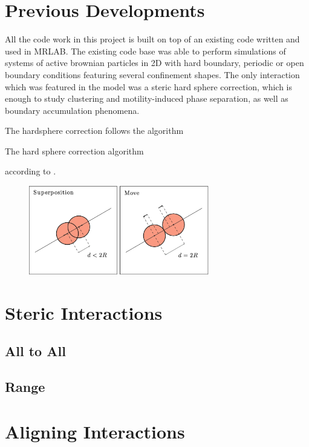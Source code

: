 \documentclass[../master_thesis_np.tex]{subfiles}
\begin{document}
	\section{Previous Developments}
	All the code work in this project is built on top of an existing code written and used in {\color{blue} MRLAB}. The existing code base was able to perform simulations of systems of active brownian particles in 2D with hard boundary, periodic or open boundary conditions featuring several confinement shapes. The only interaction which was featured in the model was a steric hard sphere correction, which is enough to study clustering and motility-induced phase separation, as well as boundary accumulation phenomena.
	
	The hardsphere correction follows the algorithm
	\begin{algorithm}[htp]
		\caption{The hard sphere correction algorithm} \label{alg:hardsphere}	
		\begin{algorithmic}[1]
			 

			\EndIf
			\EndFor
		\end{algorithmic}
		\end{algorithm}
		according to \parencite{callegari_numerical_2019}.

		\begin{figure}[htp]
			\centering
			\includegraphics[width = 0.7\textwidth]{callegari_volpe_2019_hardsphere.png}
			\label{fig:hardsphere}
			\caption{{\small {}}}
		\end{figure}
	\section{Steric Interactions}
	\subsection{All to All}
	\subsection{Range}
	\section{Aligning Interactions}
\end{document}
